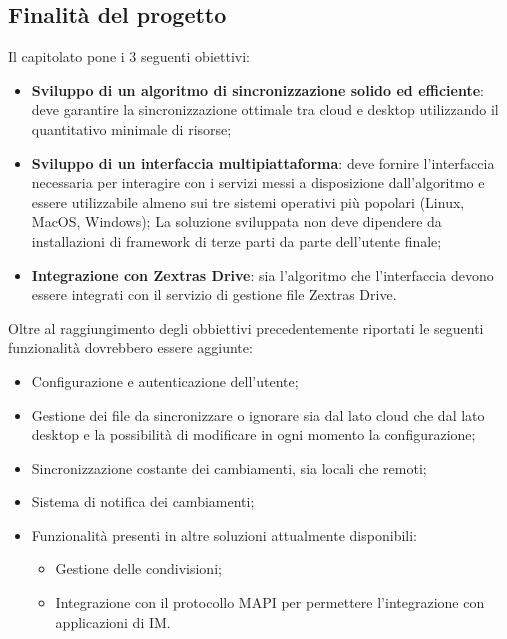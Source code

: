 \subsection{Finalità del progetto}
Il capitolato pone i 3 seguenti obiettivi:
\begin{itemize}
\item \textbf{Sviluppo di un algoritmo di sincronizzazione solido ed efficiente}: deve garantire la sincronizzazione ottimale tra cloud e desktop utilizzando il quantitativo minimale di risorse;
\item \textbf{Sviluppo di un interfaccia multipiattaforma}: deve fornire l'interfaccia necessaria per interagire con i servizi messi a disposizione 
dall'algoritmo e essere utilizzabile almeno sui tre sistemi operativi più popolari (Linux, MacOS, Windows);
La soluzione sviluppata non deve dipendere da installazioni di framework di terze parti da parte dell'utente finale;
\item \textbf{Integrazione con Zextras Drive}: sia l'algoritmo che l'interfaccia devono essere integrati con il servizio di gestione file Zextras Drive.
\end{itemize}
Oltre al raggiungimento degli obbiettivi precedentemente riportati le seguenti funzionalità dovrebbero essere aggiunte:
\begin{itemize}
\item Configurazione e autenticazione dell'utente;
\item Gestione dei file da sincronizzare o ignorare sia dal lato cloud che dal lato desktop e la possibilità di modificare in ogni momento la configurazione;
\item Sincronizzazione costante dei cambiamenti, sia locali che remoti;
\item Sistema di notifica dei cambiamenti;
\item Funzionalità presenti in altre soluzioni attualmente disponibili:
	\begin{itemize}
	\item Gestione delle condivisioni;
	\item Integrazione con il protocollo MAPI per permettere l'integrazione con applicazioni di IM.
	\end{itemize}
\end{itemize}

